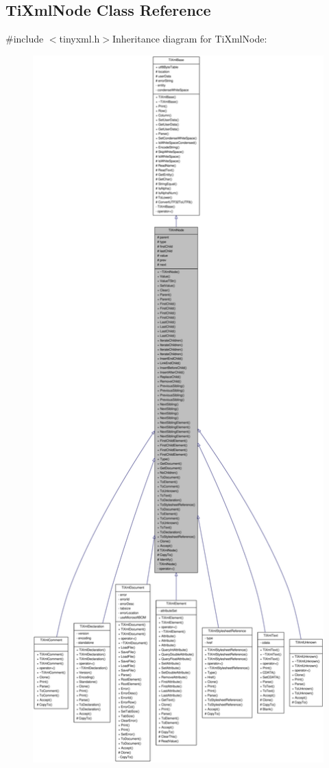 \hypertarget{class_ti_xml_node}{
\subsection{TiXmlNode Class Reference}
\label{class_ti_xml_node}
}


{\ttfamily \#include $<$tinyxml.h$>$}Inheritance diagram for TiXmlNode:\nopagebreak
\begin{figure}[H]
\begin{center}
\leavevmode
\includegraphics[width=400pt]{class_ti_xml_node__inherit__graph}
\end{center}
\end{figure}
